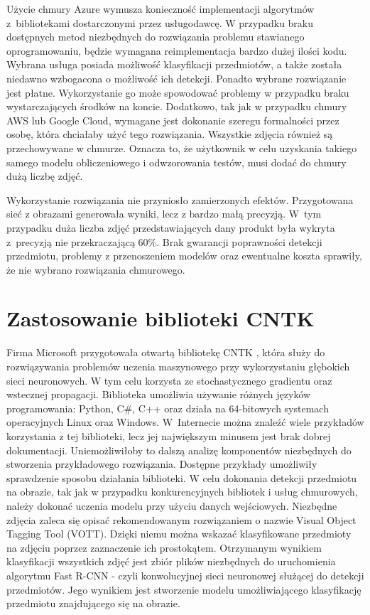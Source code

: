 {Użycie chmury Azure wymusza konieczność implementacji algorytmów z~bibliotekami dostarczonymi przez usługodawcę. W przypadku braku dostępnych metod niezbędnych do rozwiązania problemu stawianego oprogramowaniu, będzie wymagana reimplementacja bardzo dużej ilości kodu. Wybrana usługa posiada możliwość klasyfikacji przedmiotów, a także została niedawno wzbogacona o możliwość ich detekcji. Ponadto wybrane rozwiązanie jest płatne. Wykorzystanie go może spowodować problemy w przypadku braku wystarczających środków na koncie. Dodatkowo, tak jak w przypadku chmury AWS lub Google Cloud, wymagane jest dokonanie szeregu formalności przez osobę, która chciałaby użyć tego rozwiązania. Wszystkie zdjęcia również są przechowywane w chmurze. Oznacza to, że użytkownik w celu uzyskania takiego samego modelu obliczeniowego i odwzorowania testów, musi dodać do chmury dużą liczbę zdjęć. 

Wykorzystanie rozwiązania nie przyniosło zamierzonych efektów. Przygotowana sieć z obrazami generowała wyniki, lecz z bardzo małą precyzją. W~tym przypadku duża liczba zdjęć przedstawiających dany produkt była wykryta z~precyzją nie przekraczającą 60\%. Brak gwarancji poprawności detekcji przedmiotu, problemy z przenoszeniem modelów oraz ewentualne koszta sprawiły, że nie wybrano rozwiązania chmurowego.

\section{Zastosowanie biblioteki CNTK}{
Firma Microsoft przygotowała otwartą bibliotekę CNTK \cite{CNTK}, która służy do rozwiązywania problemów uczenia maszynowego przy wykorzystaniu głębokich sieci neuronowych. W tym celu korzysta ze stochastycznego gradientu oraz wstecznej propagacji. Biblioteka umożliwia używanie różnych języków programowania: Python, C\#, C++ oraz działa na 64-bitowych systemach operacyjnych Linux oraz Windows. W~Internecie można znaleźć wiele przykładów korzystania z tej biblioteki, lecz jej największym minusem jest brak dobrej dokumentacji. Uniemożliwiłoby to dalszą analizę komponentów niezbędnych do stworzenia przykładowego rozwiązania. Dostępne przykłady umożliwiły sprawdzenie sposobu działania biblioteki. W celu dokonania detekcji przedmiotu na obrazie, tak jak w przypadku konkurencyjnych bibliotek i usług chmurowych, należy dokonać uczenia modelu przy użyciu danych wejściowych. Niezbędne zdjęcia zaleca się opisać rekomendowanym rozwiązaniem o nazwie Visual Object Tagging Tool (VOTT)\cite{VOTT}. Dzięki niemu można wskazać klasyfikowane przedmioty na zdjęciu poprzez zaznaczenie ich prostokątem. Otrzymanym wynikiem klasyfikacji wszystkich zdjęć jest zbiór plików niezbędnych do uruchomienia algorytmu Fast R-CNN - czyli konwolucyjnej sieci neuronowej służącej do detekcji przedmiotów. Jego wynikiem jest stworzenie modelu umożliwiającego klasyfikację przedmiotu znajdującego się na obrazie. 

}}

